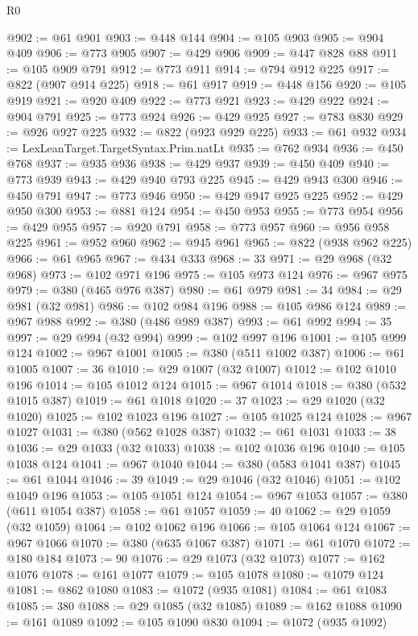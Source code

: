 \begin{lexlean}{R0}
\begin{coremodule}
@902 := @61 @901
@903 := @448 @144
@904 := @105 @903
@905 := @904 @409
@906 := @773 @905
@907 := @429 @906
@909 := @447 @828 @88
@911 := @105 @909 @791
@912 := @773 @911
@914 := @794 @912 @225
@917 := @822 (@907 @914 @225)
@918 := @61 @917
@919 := @448 @156
@920 := @105 @919
@921 := @920 @409
@922 := @773 @921
@923 := @429 @922
@924 := @904 @791
@925 := @773 @924
@926 := @429 @925
@927 := @783 @830
@929 := @926 @927 @225
@932 := @822 (@923 @929 @225)
@933 := @61 @932
@934 := LexLeanTarget.TargetSyntax.Prim.natLt
@935 := @762 @934
@936 := @450 @768
@937 := @935 @936
@938 := @429 @937
@939 := @450 @409
@940 := @773 @939
@943 := @429 @940 @793 @225
@945 := @429 @943 @300
@946 := @450 @791
@947 := @773 @946
@950 := @429 @947 @925 @225
@952 := @429 @950 @300
@953 := @881 @124
@954 := @450 @953
@955 := @773 @954
@956 := @429 @955
@957 := @920 @791
@958 := @773 @957
@960 := @956 @958 @225
@961 := @952 @960
@962 := @945 @961
@965 := @822 (@938 @962 @225)
@966 := @61 @965
@967 := @434 @333
@968 := 33
@971 := @29 @968 (@32 @968)
@973 := @102 @971 @196
@975 := @105 @973 @124
@976 := @967 @975
@979 := @380 (@465 @976 @387)
@980 := @61 @979
@981 := 34
@984 := @29 @981 (@32 @981)
@986 := @102 @984 @196
@988 := @105 @986 @124
@989 := @967 @988
@992 := @380 (@486 @989 @387)
@993 := @61 @992
@994 := 35
@997 := @29 @994 (@32 @994)
@999 := @102 @997 @196
@1001 := @105 @999 @124
@1002 := @967 @1001
@1005 := @380 (@511 @1002 @387)
@1006 := @61 @1005
@1007 := 36
@1010 := @29 @1007 (@32 @1007)
@1012 := @102 @1010 @196
@1014 := @105 @1012 @124
@1015 := @967 @1014
@1018 := @380 (@532 @1015 @387)
@1019 := @61 @1018
@1020 := 37
@1023 := @29 @1020 (@32 @1020)
@1025 := @102 @1023 @196
@1027 := @105 @1025 @124
@1028 := @967 @1027
@1031 := @380 (@562 @1028 @387)
@1032 := @61 @1031
@1033 := 38
@1036 := @29 @1033 (@32 @1033)
@1038 := @102 @1036 @196
@1040 := @105 @1038 @124
@1041 := @967 @1040
@1044 := @380 (@583 @1041 @387)
@1045 := @61 @1044
@1046 := 39
@1049 := @29 @1046 (@32 @1046)
@1051 := @102 @1049 @196
@1053 := @105 @1051 @124
@1054 := @967 @1053
@1057 := @380 (@611 @1054 @387)
@1058 := @61 @1057
@1059 := 40
@1062 := @29 @1059 (@32 @1059)
@1064 := @102 @1062 @196
@1066 := @105 @1064 @124
@1067 := @967 @1066
@1070 := @380 (@635 @1067 @387)
@1071 := @61 @1070
@1072 := @180 @184
@1073 := 90
@1076 := @29 @1073 (@32 @1073)
@1077 := @162 @1076
@1078 := @161 @1077
@1079 := @105 @1078
@1080 := @1079 @124
@1081 := @862 @1080
@1083 := @1072 (@935 @1081)
@1084 := @61 @1083
@1085 := 380
@1088 := @29 @1085 (@32 @1085)
@1089 := @162 @1088
@1090 := @161 @1089
@1092 := @105 @1090 @830
@1094 := @1072 (@935 @1092)

\end{coremodule}
\end{lexlean}
